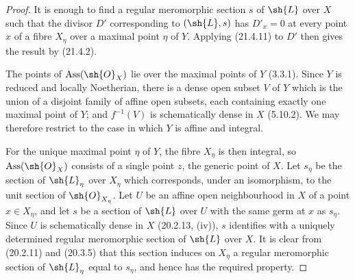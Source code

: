 \begin{proof}
It is enough to find a regular meromorphic section $s$ of $\sh{L}$ over
$X$ such that the divisor $D'$ corresponding to $(\sh{L},s)$ has
$D'_x=0$ at every point $x$ of a fibre $X_\eta$ over a maximal point
$\eta$ of $Y$.  Applying (21.4.11) to $D'$ then gives the result by
(21.4.2).

The points of $\operatorname{Ass}(\sh{O}_X)$ lie over the maximal
points of $Y$ (3.3.1).  Since $Y$ is reduced and locally Noetherian,
there is a dense open subset $V$ of $Y$ which is the union of a
disjoint family of affine open subsets, each containing exactly one
maximal point of $Y$; and $f^{-1}(V)$ is schematically dense in $X$
(5.10.2).  We may therefore restrict to the case in which $Y$ is
affine and integral.

For the unique maximal point $\eta$ of $Y$, the fibre $X_\eta$ is then
integral, so $\operatorname{Ass}(\sh{O}_X)$ consists of a single point
$z$, the generic point of $X$.  Let $s_\eta$ be the section of
$\sh{L}_\eta$ over $X_\eta$ which corresponds, under an isomorphism,
to the unit section of $\sh{O}_{X_\eta}$.  Let $U$ be an affine open
neighbourhood in $X$ of a point $x\in X_\eta$, and let $s$ be a section
of $\sh{L}$ over $U$ with the same germ at $x$ as $s_\eta$.  Since $U$
is schematically dense in $X$ (20.2.13, (iv)), $s$ identifies with a
uniquely determined regular meromorphic section of $\sh{L}$ over $X$.
It is clear from (20.2.11) and (20.3.5) that this section induces on
$X_\eta$ a regular meromorphic section of $\sh{L}_\eta$ equal to
$s_\eta$, and hence has the required property.
\end{proof}

